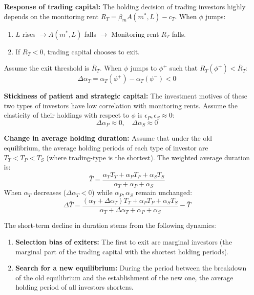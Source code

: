 \documentclass[12pt,a4paper]{article}
\begin{document}
\textbf{Response of trading capital:}
The holding decision of trading investors highly depends on the monitoring rent $R_T = \beta_m A(m^*, L) - c_T$. 
When $\phi$ jumps:
\begin{enumerate}
    \item $L$ rises $\to A(m^*, L)$ falls $\to$ Monitoring rent $R_T$ falls.
    \item If $R_T < 0$, trading capital chooses to exit.
\end{enumerate}
Assume the exit threshold is $\bar{R}_T$. When $\phi$ jumps to $\phi^+$ such that $R_T(\phi^+) < \bar{R}_T$:
\begin{equation}
\Delta \alpha_T = \alpha_T(\phi^+) - \alpha_T(\phi^-) < 0
\end{equation}

\textbf{Stickiness of patient and strategic capital:}
The investment motives of these two types of investors have low correlation with monitoring rents. Assume the elasticity of their holdings with respect to $\phi$ is $\epsilon_P, \epsilon_S \approx 0$:
\begin{equation}
\Delta \alpha_P \approx 0, \quad \Delta \alpha_S \approx 0
\end{equation}

\textbf{Change in average holding duration:}
Assume that under the old equilibrium, the average holding periods of each type of investor are $T_T < T_P < T_S$ (where trading-type is the shortest). The weighted average duration is:
\begin{equation}
\bar{T} = \frac{\alpha_T T_T + \alpha_P T_P + \alpha_S T_S}{\alpha_T + \alpha_P + \alpha_S}
\end{equation}
When $\alpha_T$ decreases ($\Delta \alpha_T < 0$) while $\alpha_P, \alpha_S$ remain unchanged:
\begin{equation}
\Delta \bar{T} = \frac{(\alpha_T + \Delta \alpha_T)T_T + \alpha_P T_P + \alpha_S T_S}{\alpha_T + \Delta \alpha_T + \alpha_P + \alpha_S} - \bar{T}
\end{equation}

The short-term decline in duration stems from the following dynamics:
\begin{enumerate}
    \item \textbf{Selection bias of exiters:} The first to exit are marginal investors (the marginal part of the trading capital with the shortest holding periods).
    \item \textbf{Search for a new equilibrium:} During the period between the breakdown of the old equilibrium and the establishment of the new one, the average holding period of all investors shortens.
\end{enumerate}
\end{document}
